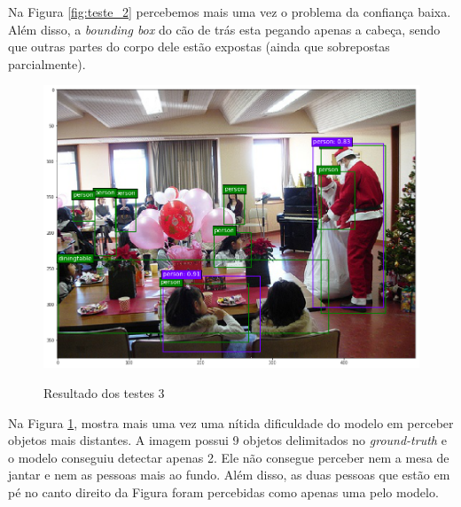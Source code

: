 Na Figura \ref{fig:teste_2} percebemos mais uma vez o problema da confiança baixa. Além disso, a \textit{bounding box} do cão de trás esta pegando apenas a cabeça, sendo que outras partes do corpo dele estão expostas (ainda que sobrepostas parcialmente).


\begin{figure}[H]
	\setlength{\abovecaptionskip}{0pt}
	\setlength{\belowcaptionskip}{0pt}
	\caption[Resultado dos testes 3]{Resultado dos testes 3}
	\centering
	\includegraphics[width=.6\textwidth]{imagem/test_image_1.png}
	\captionsetup{justification=centering}
	\label{fig:teste_3}
\end{figure}

Na Figura \ref{fig:teste_3}, mostra mais uma vez uma nítida dificuldade do modelo em perceber objetos mais distantes. A imagem possui 9 objetos delimitados no \textit{ground-truth} e o modelo conseguiu detectar apenas 2. Ele não consegue perceber nem a mesa de jantar e nem as pessoas mais ao fundo. Além disso, as duas pessoas que estão em pé no canto direito da Figura foram percebidas como apenas uma pelo modelo.


